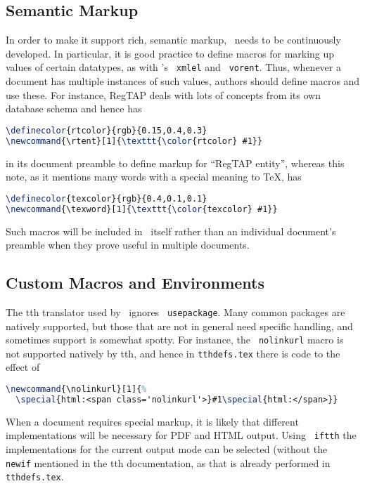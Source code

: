 \documentclass[11pt,a4paper]{ivoa}
\newcommand{\texword}[1]{\texttt{\color{texcolor} #1}}
\begin{document}
\subsection{Semantic Markup}

In order to make it support rich, semantic markup, \ivoatex\ needs to be
continuously developed.  In particular, it is good practice to define
macros for marking up values of certain datatypes, as with \ivoatex's
\texword{xmlel} and \texword{vorent}.  
Thus, whenever a document has multiple
instances of such values, authors should define macros and use these.
For instance, RegTAP deals with lots of concepts from its own
database schema and hence has
\begin{lstlisting}[language=TeX]
\definecolor{rtcolor}{rgb}{0.15,0.4,0.3}
\newcommand{\rtent}[1]{\texttt{\color{rtcolor} #1}}
\end{lstlisting}
in its document preamble to
define markup for ``RegTAP entity'', whereas
this note, as it mentions many words with a special meaning to \TeX, has
\begin{lstlisting}[language=TeX]
\definecolor{texcolor}{rgb}{0.4,0.1,0.1}
\newcommand{\texword}[1]{\texttt{\color{texcolor} #1}}
\end{lstlisting}
Such macros will be included in \ivoatex\ itself rather than an
individual document's preamble when they prove useful in multiple
documents.

\subsection{Custom Macros and Environments}

The tth translator used by \ivoatex\ ignores \texword{usepackage}.  Many
common packages are natively supported, but those that are not in
general need specific handling, and sometimes support is somewhat spotty.  
For instance, the \texword{nolinkurl}
macro is not supported natively by tth, and hence in
\texttt{tthdefs.tex} there is code to the effect of
\begin{lstlisting}[language=TeX]
\newcommand{\nolinkurl}[1]{%
  \special{html:<span class='nolinkurl'>}#1\special{html:</span>}}
\end{lstlisting}

When a document requires special markup, it is likely that 
different implementations will be necessary for PDF and HTML output.
Using \texword{iftth} the implementations for the current output mode
can be selected (without the \texword{newif} mentioned in the tth
documentation, as that is already performed in \texttt{tthdefs.tex}.
\end{document}
